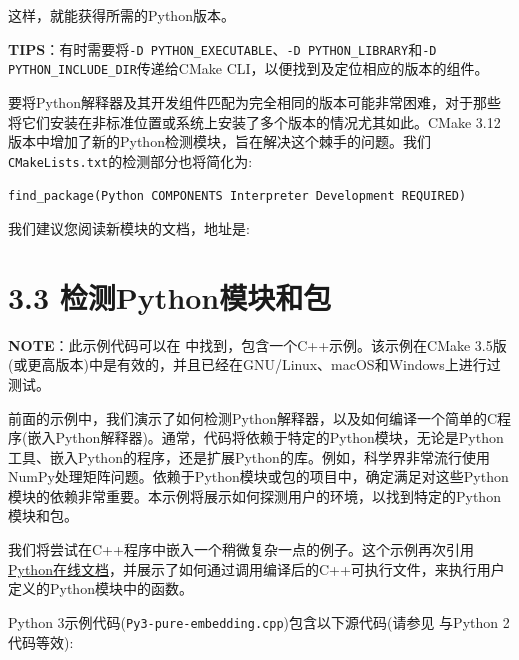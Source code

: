 这样，就能获得所需的Python版本。

\begin{myInfoBox}
\textbf{TIPS}：有时需要将\texttt{-D PYTHON\_EXECUTABLE}、\texttt{-D PYTHON\_LIBRARY}和\texttt{-D PYTHON\_INCLUDE\_DIR}传递给CMake CLI，以便找到及定位相应的版本的组件。
\end{myInfoBox}

要将Python解释器及其开发组件匹配为完全相同的版本可能非常困难，对于那些将它们安装在非标准位置或系统上安装了多个版本的情况尤其如此。CMake 3.12版本中增加了新的Python检测模块，旨在解决这个棘手的问题。我们\texttt{CMakeLists.txt}的检测部分也将简化为:

\texttt{find\_package(Python COMPONENTS Interpreter Development REQUIRED)}

我们建议您阅读新模块的文档，地址是: 


\section{3.3 检测Python模块和包}

\begin{myInfoBox}
\textbf{NOTE}：此示例代码可以在  中找到，包含一个C++示例。该示例在CMake 3.5版(或更高版本)中是有效的，并且已经在GNU/Linux、macOS和Windows上进行过测试。
\end{myInfoBox}

前面的示例中，我们演示了如何检测Python解释器，以及如何编译一个简单的C程序(嵌入Python解释器)。通常，代码将依赖于特定的Python模块，无论是Python工具、嵌入Python的程序，还是扩展Python的库。例如，科学界非常流行使用NumPy处理矩阵问题。依赖于Python模块或包的项目中，确定满足对这些Python模块的依赖非常重要。本示例将展示如何探测用户的环境，以找到特定的Python模块和包。


我们将尝试在C++程序中嵌入一个稍微复杂一点的例子。这个示例再次引用\href{https://docs.python.org/3.5/extending/embedding.html\#pureembedded}{Python在线文档}，并展示了如何通过调用编译后的C++可执行文件，来执行用户定义的Python模块中的函数。

Python 3示例代码(\texttt{Py3-pure-embedding.cpp})包含以下源代码(请参见 与Python 2代码等效):

